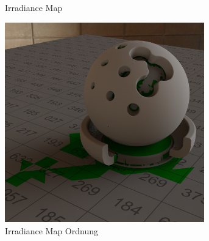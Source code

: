 \begin{figure}[h]
\begin{subfigure}[t]{0.245\textwidth}
			\caption{Irradiance Map}
		\end{subfigure}
		\begin{subfigure}[t]{0.245\textwidth}
			\center
			\includegraphics[width=0.95\textwidth]{pic/irrmap-shaderball_e-irrmap-order.png}
			\caption{Irradiance Map Ordnung}
		\end{subfigure}
		\caption{}
	\end{figure}

